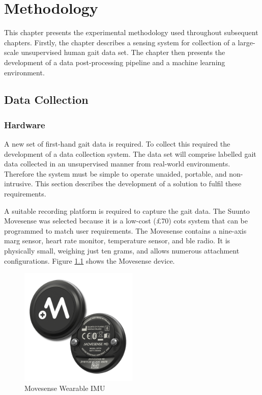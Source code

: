 \chapter{Methodology}
\label{chp:methods}
This chapter presents the experimental methodology used throughout subsequent chapters. Firstly, the chapter describes a sensing system for collection of a large-scale unsupervised human gait data set. The chapter then presents the development of a data post-processing pipeline and a machine learning environment.

\section{Data Collection}
\subsection{Hardware}
A new set of first-hand gait data is required. To collect this required the development of a data collection system. The data set will comprise labelled gait data collected in an unsupervised manner from real-world environments. Therefore the system must be simple to operate unaided, portable, and non-intrusive. This section describes the development of a solution to fulfil these requirements.

A suitable recording platform is required to capture the gait data. The Suunto Movesense was selected because it is a low-cost (£70) \acrfull{cots} system that can be programmed to match user requirements. The Movesense contains a nine-axis \acrshort{marg} sensor, heart rate monitor, temperature sensor, and \acrshort{ble} radio. It is physically small, weighing just ten grams, and allows numerous attachment configurations.  Figure \ref{fig:methods-movesense-sensor} shows the Movesense device.

\begin{figure}[hbt]
    \centering
    \includegraphics[width=0.5\textwidth]{content/3-Methods/Movesense-MD-front-and-back.png}
    \caption[Movesense Wearable IMU]{Movesense Wearable IMU\cite{movesensepress2022}}
    \label{fig:methods-movesense-sensor}
\end{figure}

